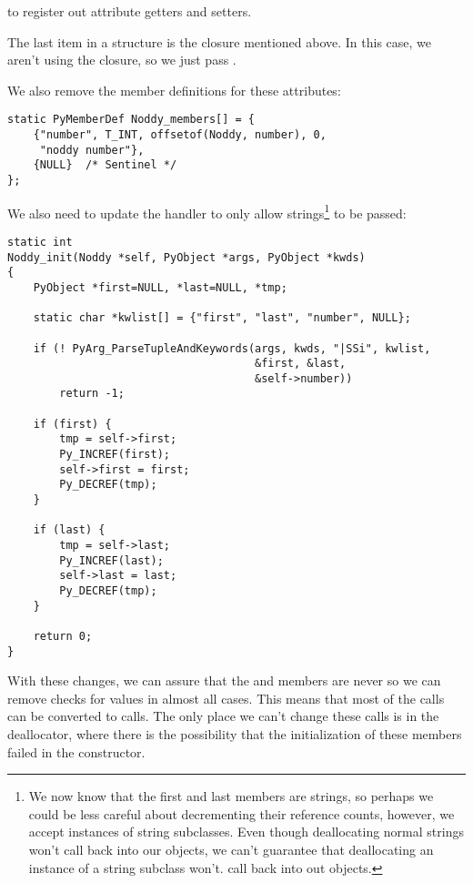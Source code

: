to register out attribute getters and setters.

The last item in a  structure is the closure
mentioned above. In this case, we aren't using the closure, so we just
pass \NULL.

We also remove the member definitions for these attributes:

\begin{verbatim}
static PyMemberDef Noddy_members[] = {
    {"number", T_INT, offsetof(Noddy, number), 0,
     "noddy number"},
    {NULL}  /* Sentinel */
};
\end{verbatim}

We also need to update the  handler to only allow
strings\footnote{We now know that the first and last members are strings,
so perhaps we could be less careful about decrementing their
reference counts, however, we accept instances of string subclasses.
Even though deallocating normal strings won't call back into our
objects, we can't guarantee that deallocating an instance of a string
subclass won't. call back into out objects.} to be passed:

\begin{verbatim}
static int
Noddy_init(Noddy *self, PyObject *args, PyObject *kwds)
{
    PyObject *first=NULL, *last=NULL, *tmp;

    static char *kwlist[] = {"first", "last", "number", NULL};

    if (! PyArg_ParseTupleAndKeywords(args, kwds, "|SSi", kwlist,
                                      &first, &last,
                                      &self->number))
        return -1;

    if (first) {
        tmp = self->first;
        Py_INCREF(first);
        self->first = first;
        Py_DECREF(tmp);
    }

    if (last) {
        tmp = self->last;
        Py_INCREF(last);
        self->last = last;
        Py_DECREF(tmp);
    }

    return 0;
}
\end{verbatim}

With these changes, we can assure that the  and
 members are never \NULL{} so we can remove checks for \NULL{}
values in almost all cases. This means that most of the
 calls can be converted to 
calls. The only place we can't change these calls is in the
deallocator, where there is the possibility that the initialization of
these members failed in the constructor.

